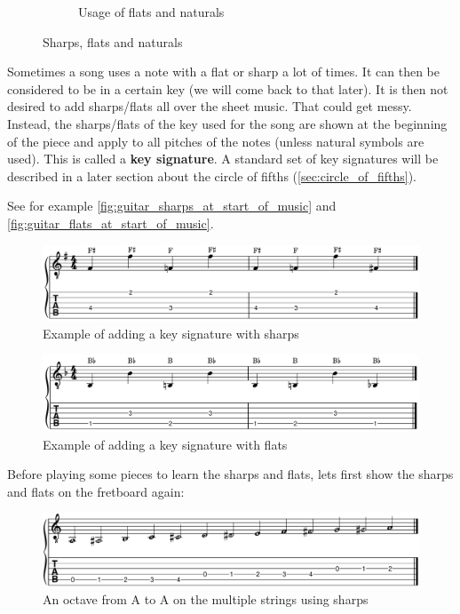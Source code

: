 \begin{figure}[h]
\begin{subfigure}[b]{0.45\textwidth}
		\caption{Usage of flats and naturals}
		\label{fig:guitar_usage_of_flats_and_naturals}
	\end{subfigure}
	\caption{Sharps, flats and naturals}
\end{figure}

Sometimes a song uses a note with a flat or sharp a lot of times. It can then be considered to be in a certain key (we will come back to that later). It is then not desired to add sharps/flats all over the sheet music. That could get messy. Instead, the sharps/flats of the key used for the song are shown at the beginning of the piece and apply to all pitches of the notes (unless natural symbols are used). This is called a \textbf{key signature}. A standard set of key signatures will be described in a later section about the circle of fifths (\autoref{sec:circle_of_fifths}).

See for example \autoref{fig:guitar_sharps_at_start_of_music} and \autoref{fig:guitar_flats_at_start_of_music}.

\begin{figure}[h]
	\centering
	\includegraphics[width=\textwidth]{../../MuseScore/Guitar/GuitarKeySharpExample.png}
	\caption{Example of adding a key signature with sharps}
	\label{fig:guitar_sharps_at_start_of_music}
\end{figure}

\begin{figure}[h]
	\centering
	\includegraphics[width=\textwidth]{../../MuseScore/Guitar/GuitarKeyFlatExample.png}
	\caption{Example of adding a key signature with flats}
	\label{fig:guitar_flats_at_start_of_music}
\end{figure}

\newpage

Before playing some pieces to learn the sharps and flats, lets first show the sharps and flats on the fretboard again:

\begin{figure}[h]
	\centering
	\includegraphics[width=\textwidth]{../../MuseScore/Guitar/PitchesSharpsMultiString.png}
	\caption{An octave from A to A on the multiple strings using sharps}
	\label{fig:guitar_string_a_octave_multi_string_sharps_chap_music_notation}
\end{figure}

